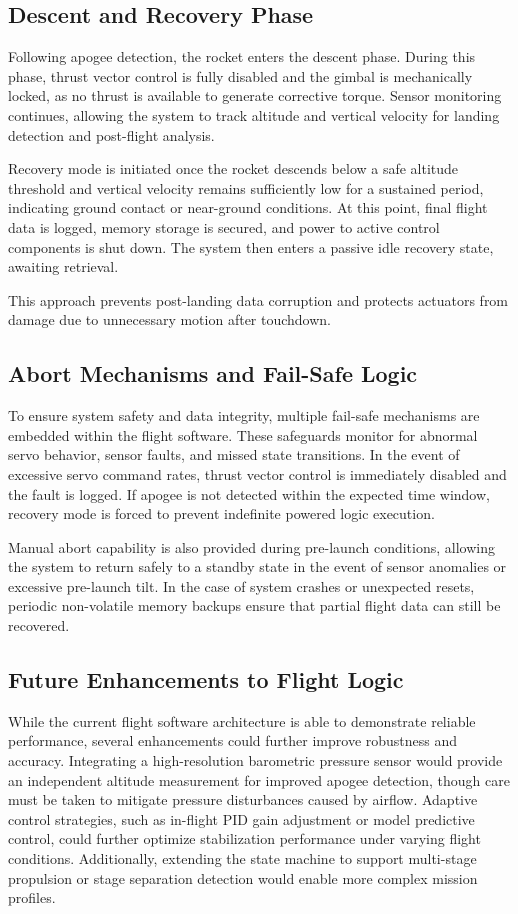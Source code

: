 \subsection{Descent and Recovery Phase}

Following apogee detection, the rocket enters the descent phase. During this phase, thrust vector control is fully disabled and the gimbal is mechanically locked, as no thrust is available to generate corrective torque. Sensor monitoring continues, allowing the system to track altitude and vertical velocity for landing detection and post-flight analysis.

Recovery mode is initiated once the rocket descends below a safe altitude threshold and vertical velocity remains sufficiently low for a sustained period, indicating ground contact or near-ground conditions. At this point, final flight data is logged, memory storage is secured, and power to active control components is shut down. The system then enters a passive idle recovery state, awaiting retrieval.

This approach prevents post-landing data corruption and protects actuators from damage due to unnecessary motion after touchdown.


\subsection{Abort Mechanisms and Fail-Safe Logic}

To ensure system safety and data integrity, multiple fail-safe mechanisms are embedded within the flight software. These safeguards monitor for abnormal servo behavior, sensor faults, and missed state transitions. In the event of excessive servo command rates, thrust vector control is immediately disabled and the fault is logged. If apogee is not detected within the expected time window, recovery mode is forced to prevent indefinite powered logic execution.

Manual abort capability is also provided during pre-launch conditions, allowing the system to return safely to a standby state in the event of sensor anomalies or excessive pre-launch tilt. In the case of system crashes or unexpected resets, periodic non-volatile memory backups ensure that partial flight data can still be recovered.


\subsection{Future Enhancements to Flight Logic}

While the current flight software architecture is able to demonstrate reliable performance, several enhancements could further improve robustness and accuracy. Integrating a high-resolution barometric pressure sensor would provide an independent altitude measurement for improved apogee detection, though care must be taken to mitigate pressure disturbances caused by airflow. Adaptive control strategies, such as in-flight PID gain adjustment or model predictive control, could further optimize stabilization performance under varying flight conditions. Additionally, extending the state machine to support multi-stage propulsion or stage separation detection would enable more complex mission profiles.


